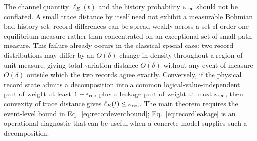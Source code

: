 \documentclass[pdflatex,sn-mathphys-num]{sn-jnl}
\theoremstyle{thmstyleone}
\begin{document}
The channel quantity $\ell_E(t)$ and the history probability $\varepsilon_{\rm rec}$ should not be conflated. A small trace distance by itself need not exhibit a measurable Bohmian bad-history set: record differences can be spread weakly across a set of order-one equilibrium measure rather than concentrated on an exceptional set of small path measure. This failure already occurs in the classical special case: two record distributions may differ by an $O(\delta)$ change in density throughout a region of unit measure, giving total-variation distance $O(\delta)$ without any event of measure $O(\delta)$ outside which the two records agree exactly. Conversely, if the physical record state admits a decomposition into a common logical-value-independent part of weight at least $1-\varepsilon_{\rm rec}$ plus a leakage part of weight at most $\varepsilon_{\rm rec}$, then convexity of trace distance gives $\ell_E(t)\le\varepsilon_{\rm rec}$. The main theorem requires the event-level bound in Eq.~\eqref{eq:recordeventbound}; Eq.~\eqref{eq:recordleakage} is an operational diagnostic that can be useful when a concrete model supplies such a decomposition.
\end{document}
